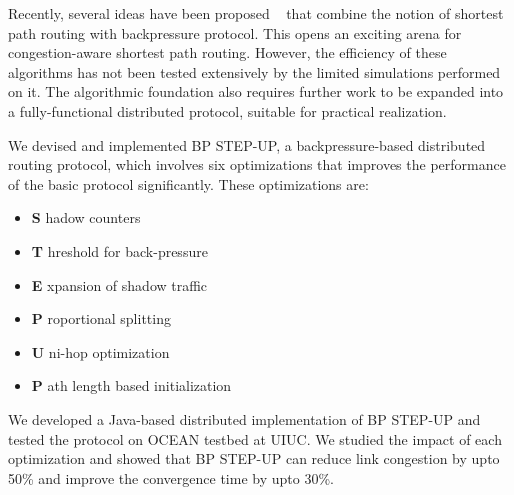 
Recently, several ideas have been proposed ~\cite{Srikant3, Austin1} that combine the notion of shortest path routing with backpressure protocol. This opens an exciting arena for congestion-aware shortest path routing. However, the efficiency of these algorithms has not been tested extensively by the limited simulations performed on it. The algorithmic foundation also requires further work to be expanded into a fully-functional distributed protocol, suitable for practical realization. 

We devised and implemented BP STEP-UP, a backpressure-based distributed routing protocol, which involves six optimizations that improves the performance of the basic protocol significantly. 
These optimizations are:

\begin{itemize}[noitemsep]
\item[] \textbf{\large S} hadow counters ~\cite{Srikant3}
\item[] \textbf{\large T} hreshold for back-pressure ~\cite{Srikant3}
\item[] \textbf{\large E} xpansion of shadow traffic ~\cite{Srikant3}
\item[] \textbf{\large P} roportional splitting \\
\item[] \textbf{\large U} ni-hop optimization
\item[] \textbf{\large P} ath length based initialization
\end{itemize}
 
We developed a Java-based distributed implementation of BP STEP-UP and tested the protocol on OCEAN testbed at UIUC. We studied the impact of each optimization and showed that BP STEP-UP can reduce link congestion by upto 50\% and improve the convergence time by upto 30\%.